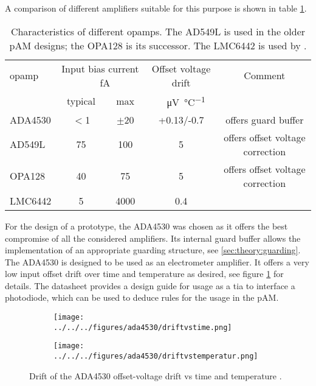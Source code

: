 A comparison of different amplifiers suitable for this purpose is shown in table \ref{tab:opamps}.
\begin{table}
	\centering
	\begin{tabular}{lcccc}
		\hline
		\ac{opamp} & \multicolumn{2}{c}{Input bias current \SI[per-mode=symbol]{}{\per\femto\ampere}} & Offset voltage drift & Comment \\
				&	typical	 	& max											 & \SI[per-mode=symbol]{}{\per\micro\volt\per\degreeCelsius} & \\\hline
		ADA4530 \cite{ADA4530} & $<$\SI{1}{} 	& $\pm$\SI{20}{}								 & +0.13/-0.7 & offers guard buffer \\
		AD549L \cite{AD549} & 75 	& 100											 & 5 & offers offset voltage correction \\
 	 OPA128 \cite{OPA128} & 40 	& 75											 & 5 & offers offset voltage correction \\
		LMC6442 \cite{LMC6442}& 5 	& 4000											 & 0.4 & \\
		\hline
	\end{tabular}
\caption{Characteristics of different \acp{opamp}. The AD549L is used in the older \ac{pAM} designs; the OPA128 is its successor. The LMC6442 is used by \cite{zagreb}.}
\label{tab:opamps}
\end{table}
For the design of a prototype, the ADA4530 was chosen as it offers the best compromise of all the considered amplifiers. Its internal guard buffer allows the implementation of an appropriate guarding structure, see \ref{sec:theory:guarding}.
The ADA4530 is designed to be used as an electrometer amplifier. It offers a very low input offset drift over time and temperature as desired, see figure \ref{fig:ada4530:offsetdrift} for details. The datasheet provides a design guide for usage as a \ac{tia} to interface a photodiode, which can be used to deduce rules for the usage in the \ac{pAM}.

\begin{figure}
	\centering
	\begin{subfigure}{0.49\textwidth}
		\texttt{[image: ../../../figures/ada4530/driftvstime.png]}
	\end{subfigure}
	\begin{subfigure}{0.49\textwidth}
		\texttt{[image: ../../../figures/ada4530/driftvstemperatur.png]}
	\end{subfigure}
	\caption{Drift of the ADA4530 offset-voltage drift vs time and temperature \cite{ADA4530}.}
	\label{fig:ada4530:offsetdrift}
\end{figure}
